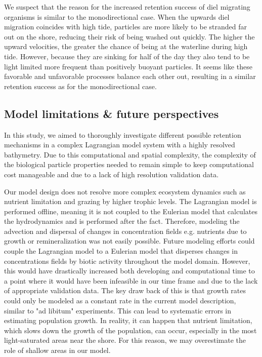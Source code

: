 \documentclass[npg, manuscript]{copernicus}
\begin{document}
We suspect that the reason for the increased retention success of diel migrating organisms is similar to the monodirectional case.
When the upwards diel migration coincides with high tide, particles are more likely to be stranded far out on the shore, reducing their risk of being washed out quickly.
The higher the upward velocities, the greater the chance of being at the waterline during high tide.
However, because they are sinking for half of the day they also tend to be light limited more frequent than positively buoyant particles.
It seems like these favorable and unfavorable processes balance each other out, resulting in a similar retention success as for the monodirectional case.


\subsection{Model limitations \& future perspectives}

In this study, we aimed to thoroughly investigate different possible retention mechanisms in a complex Lagrangian model system with a highly resolved bathymetry.  
Due to this computational and spatial complexity, the complexity of the biological particle properties needed to remain simple to keep computational cost manageable and due to a lack of high resolution validation data.

Our model design does not resolve more complex ecosystem dynamics such as nutrient limitation and grazing by higher trophic levels. 
The Lagrangian model is performed offline, meaning it is not coupled to the Eulerian model that calculates the hydrodynamics and is performed after the fact.
Therefore, modeling the advection and dispersal of changes in concentration fields e.g. nutrients due to growth or remineralization was not easily possible.
Future modeling efforts could couple the Lagrangian model to a Eulerian model that disperses changes in concentrations fields by biotic activity throughout the model domain.
However, this would have drastically increased both developing and computational time to a point where it would have been infeasible in our time frame and due to the lack of appropriate validation data.
The key draw back of this is that growth rates could only be modeled as a constant rate in the current model description, similar to "ad libitum" experiments. 
This can lead to systematic errors in estimating population growth.
In reality, it can happen that nutrient limitation, which slows down the growth of the population, can occur, especially in the most light-saturated areas near the shore. For this reason, we may overestimate the role of shallow areas in our model.
\end{document}
